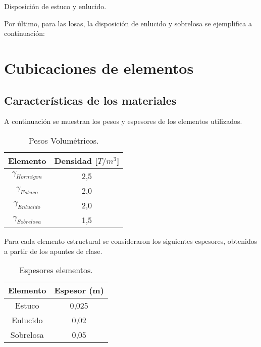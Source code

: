 \documentclass[letterpaper,11pt]{article} %
\begin{document}
\begin{images}[]{Disposición de estuco y enlucido.}
\end{images}

Por último, para las losas, la disposición de enlucido y sobrelosa se ejemplifica a continuación:


\section{Cubicaciones de elementos}

\subsection{Características de los materiales}

A continuación se muestran los pesos  y espesores de los elementos utilizados.
 
    \begin{table}[H]
      \centering
      \caption{Pesos Volumétricos.}
        \begin{tabular}{|c|c|}
        \hline
        \textbf{Elemento} &
          \boldmath{}\textbf{Densidad [$T/m^3$]}\unboldmath{}
          \bigstrut\\
        \hline
        $\gamma_{Hormigon}$ &
          2,5
          \bigstrut\\
        \hline
        $\gamma_{Estuco}$ &
          2,0
          \bigstrut\\
        \hline
        $\gamma_{Enlucido}$ &
          2,0
          \bigstrut\\
        \hline
        $\gamma_{Sobrelosa}$ &
          1,5
          \bigstrut\\
        \hline
        \end{tabular}%
      \label{volumen}%
    \end{table}%
    
Para cada elemento estructural se consideraron los siguientes espesores, obtenidos a partir de los apuntes de clase.

\begin{table}[H]
  \centering
  \caption{Espesores elementos.}
    \begin{tabular}{|c|c|}
    \hline
    \textbf{Elemento} &
      \textbf{Espesor (m)}
      \bigstrut\\
    \hline
    Estuco &
      0,025
      \bigstrut\\
    \hline
    Enlucido &
      0,02
      \bigstrut\\
    \hline
    Sobrelosa &
      0,05
      \bigstrut\\
    \hline
    \end{tabular}%
  \label{Espesor}%
\end{table}%
\end{document}
